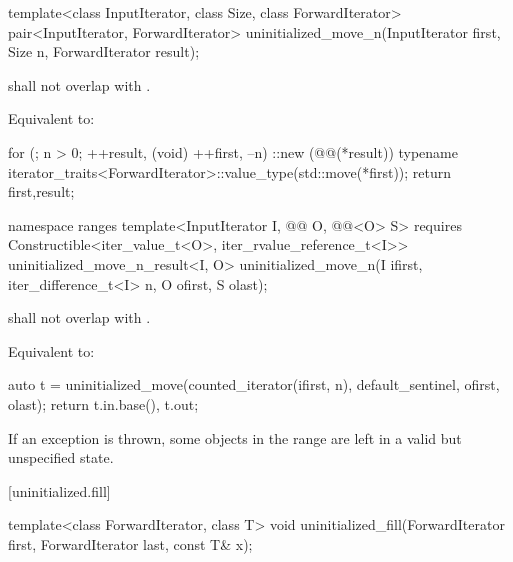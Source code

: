 %
\begin{itemdecl}
template<class InputIterator, class Size, class ForwardIterator>
  pair<InputIterator, ForwardIterator>
    uninitialized_move_n(InputIterator first, Size n, ForwardIterator result);
\end{itemdecl}

\begin{itemdescr}
\pnum
\expects
{} shall not overlap with .

\pnum
\effects
Equivalent to:
\begin{codeblock}
for (; n > 0; ++result, (void) ++first, --n)
  ::new (@@(*result))
    typename iterator_traits<ForwardIterator>::value_type(std::move(*first));
return {first,result};
\end{codeblock}
\end{itemdescr}

%
\begin{itemdecl}
namespace ranges {
  template<InputIterator I, @@ O, @@<O> S>
      requires Constructible<iter_value_t<O>, iter_rvalue_reference_t<I>>
    uninitialized_move_n_result<I, O>
      uninitialized_move_n(I ifirst, iter_difference_t<I> n, O ofirst, S olast);
}
\end{itemdecl}

\begin{itemdescr}
\pnum
\expects
{} shall not overlap with
.

\pnum
\effects Equivalent to:
\begin{codeblock}
auto t = uninitialized_move(counted_iterator(ifirst, n),
                            default_sentinel, ofirst, olast);
return {t.in.base(), t.out};
\end{codeblock}

\pnum
\begin{note}
If an exception is thrown, some objects in the range
are left in a valid but unspecified state.
\end{note}
\end{itemdescr}

[uninitialized.fill]{}

%
\begin{itemdecl}
template<class ForwardIterator, class T>
  void uninitialized_fill(ForwardIterator first, ForwardIterator last, const T& x);
\end{itemdecl}

